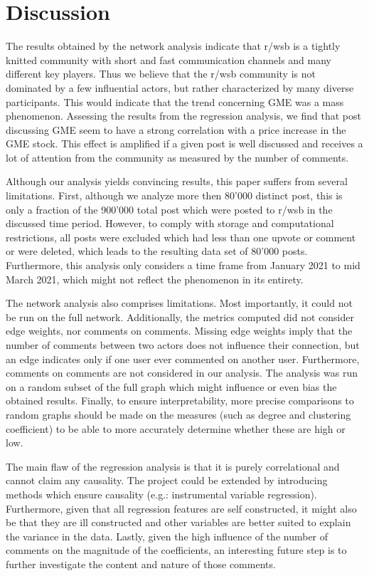 \documentclass[noacm,sigconf,authorversion]{acmart}
\begin{document}
\section{Discussion}

The results obtained by the network analysis indicate that r/wsb is a tightly knitted community with short and fast communication channels and many different key players. Thus we believe that the r/wsb community is not dominated by a few influential actors, but rather characterized by many diverse participants. This would indicate that the trend concerning GME was a mass phenomenon. Assessing the results from the regression analysis, we find that post discussing GME seem to have a strong correlation with a price increase in the GME stock. This effect is amplified if a given post is well discussed and receives a lot of attention from the community as measured by the number of comments. \par
Although our analysis yields convincing results, this paper suffers from several limitations. First, although we analyze more then 80'000 distinct post, this is only a fraction of the 900'000 total post which were posted to r/wsb in the discussed time period. However, to comply with storage and computational restrictions, all posts were excluded which had less than one upvote or comment or were deleted, which leads to the resulting data set of 80'000 posts. Furthermore, this analysis only considers a time frame from January 2021 to mid March 2021, which might not reflect the phenomenon in its entirety.\par
The network analysis also comprises limitations. Most importantly, it could not be run on the full network. Additionally, the metrics computed did not consider edge weights, nor comments on comments. Missing edge weights imply that the number of comments between two actors does not influence their connection, but an edge indicates only if one user ever commented on another user. Furthermore, comments on comments are not considered in our analysis. The analysis was run on a random subset of the full graph which might influence or even bias the obtained results. Finally, to ensure interpretability, more precise comparisons to random graphs should be made on the measures (such as degree and clustering coefficient) to be able to more accurately determine whether these are high or low. \par
The main flaw of the regression analysis is that it is purely correlational and cannot claim any causality. The project could be extended by introducing methods which ensure causality (e.g.: instrumental variable regression). Furthermore, given that all regression features are self constructed, it might also be that they are ill constructed and other variables are better suited to explain the variance in the data. Lastly, given the high influence of the number of comments on the magnitude of the coefficients, an interesting future step is to further investigate the content and nature of those comments. 
\end{document}
